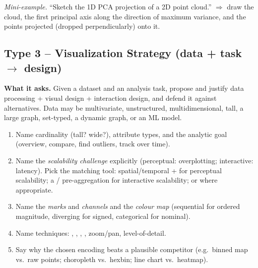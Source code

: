 \textit{Mini-example.} ``Sketch the 1D PCA projection of a 2D point cloud.''
$\Rightarrow$ draw the cloud, the first principal axis along the direction of
maximum variance, and the points projected (dropped perpendicularly) onto it.

\subsection{Type 3 -- Visualization Strategy (data + task $\to$ design)}

\textbf{What it asks.} Given a dataset and an analysis task, propose and justify
data processing + visual design + interaction design, and defend it against
alternatives. Data may be multivariate, unstructured, multidimensional, tall,
a large graph, set-typed, a dynamic graph, or an ML model.

\begin{exambox}
\begin{enumerate}[leftmargin=1.4em]
  \item {} Name cardinality (tall? wide?),
        attribute types, and the analytic goal (overview, compare, find
        outliers, track over time).
  \item {} Name the \emph{scalability challenge} explicitly
        (perceptual: overplotting; interactive: latency). Pick the matching
        tool: spatial/temporal  +  for
        perceptual scalability; a  / pre-aggregation for
        interactive scalability;  or  where appropriate.
  \item {} Name the \emph{marks} and \emph{channels} and
        the \emph{colour map} (sequential for ordered magnitude, diverging for
        signed, categorical for nominal).
  \item {} Name techniques: ,
        , , ,
        zoom/pan, level-of-detail.
  \item {} Say why the chosen encoding beats a
        plausible competitor (e.g.\ binned map vs.\ raw points; choropleth vs.\
        hexbin; line chart vs.\ heatmap).
\end{enumerate}
\end{exambox}

